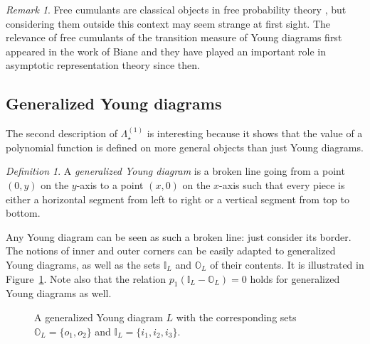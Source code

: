 \documentclass[11pt]{amsart}
\theoremstyle{plain}
\theoremstyle{remark}
\newtheorem*{remark}{Remark}
\newtheorem{definition}[lemma]{Definition}
\newcommand{\II}{\mathbb{I}}
\newcommand{\OO}{\mathbb{O}}
\newcommand{\Polun}{\Lambda_\star^{(1)}}
\begin{document}
\begin{remark}
Free cumulants are classical objects in free probability theory 
\cite{Voiculescu1986, SpeicherFreeCumulants},
but considering them outside this context may seem strange at first sight.
The relevance of free cumulants of the transition measure
of Young diagrams first appeared in the work of Biane \cite{Biane1998} and
they have played an important role in asymptotic
representation theory since then.
\end{remark}

\subsection{Generalized Young diagrams}\label{SubsectGeneralizedYD}
The second description of $\Polun$ is interesting because
it shows that the value of a polynomial function is defined
on more general objects than just Young diagrams.

\begin{definition}
    A {\em generalized Young diagram} is a broken line
    going from a point $(0,y)$ on the $y$-axis to a point $(x,0)$ on the $x$-axis
    such that every piece is either a horizontal segment from left to right or
    a vertical segment from top to bottom.
\end{definition}
Any Young diagram can be seen as such a broken line: just consider its border.
The notions of inner and outer corners can be easily adapted
to generalized Young diagrams, as well as
the sets $\II_L$ and $\OO_L$ of their contents.
It is illustrated in Figure~\ref{FigGeneralizedYD}.
Note also that the relation $p_1(\II_L-\OO_L)=0$
holds for generalized Young diagrams as well.

\begin{figure}[tb]
    \begin{center}
    \end{center}
    \caption{A generalized Young diagram $L$ with the corresponding sets $\OO_L = \{o_1,o_2\}$ and $\II_L = \{i_1, i_2, i_3\}$.}
    \label{FigGeneralizedYD}
\end{figure}
\end{document}
